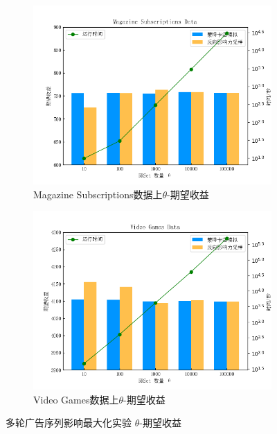 \begin{figure}[th]
    \begin{subfigure}{0.45\textwidth}
       \includegraphics[width=\linewidth]{figure/sasim/theta/cn_magazine}
        \caption{Magazine Subscriptions数据上$\theta$-期望收益}
        \label{fig:thetasub3}
    \end{subfigure}
    \hfill
    \begin{subfigure}{0.45\textwidth}
        \includegraphics[width=\linewidth]{figure/sasim/theta/cn_video}
        \caption{Video Games数据上$\theta$-期望收益}
        \label{fig:thetasub4}
    \end{subfigure}

    \caption{多轮广告序列影响最大化实验 $\theta$-期望收益}
    \label{fig:theta}
\end{figure}


